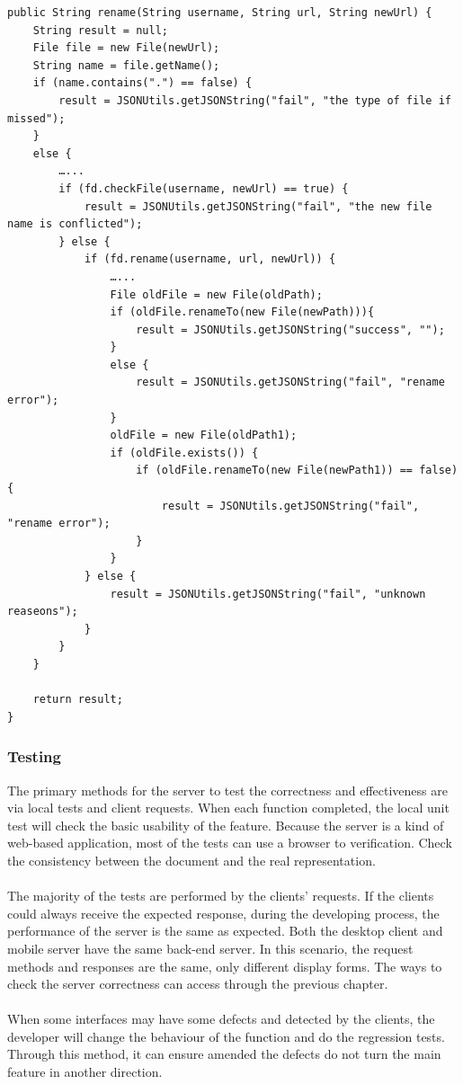\documentclass[11pt]{article}
\begin{document}
\begin{lstlisting}
public String rename(String username, String url, String newUrl) {
	String result = null;
	File file = new File(newUrl);
	String name = file.getName();
	if (name.contains(".") == false) {
		result = JSONUtils.getJSONString("fail", "the type of file if missed");
	}
	else {
		…...
		if (fd.checkFile(username, newUrl) == true) {
			result = JSONUtils.getJSONString("fail", "the new file name is conflicted");
		} else {
			if (fd.rename(username, url, newUrl)) {
				…...
				File oldFile = new File(oldPath);
				if (oldFile.renameTo(new File(newPath))){
					result = JSONUtils.getJSONString("success", "");
				}
				else {
					result = JSONUtils.getJSONString("fail", "rename error");
				}
				oldFile = new File(oldPath1);
				if (oldFile.exists()) {
					if (oldFile.renameTo(new File(newPath1)) == false) {
						result = JSONUtils.getJSONString("fail", "rename error");
					}
				}
			} else {
				result = JSONUtils.getJSONString("fail", "unknown reaseons");
			}
		}
	}
	
	return result;
}
\end{lstlisting}


\subsubsection{Testing}
The primary methods for the server to test the correctness and effectiveness are via local tests and client requests. When each function completed, the local unit test will check the basic usability of the feature. Because the server is a kind of web-based application, most of the tests can use a browser to verification. Check the consistency between the document and the real representation.
\\
\\
The majority of the tests are performed by the clients' requests. If the clients could always receive the expected response, during the developing process, the performance of the server is the same as expected. Both the desktop client and mobile server have the same back-end server. In this scenario, the request methods and responses are the same, only different display forms. The ways to check the server correctness can access through the previous chapter.
\\
\\
When some interfaces may have some defects and detected by the clients, the developer will change the behaviour of the function and do the regression tests. Through this method, it can ensure amended the defects do not turn the main feature in another direction.
\end{document}
